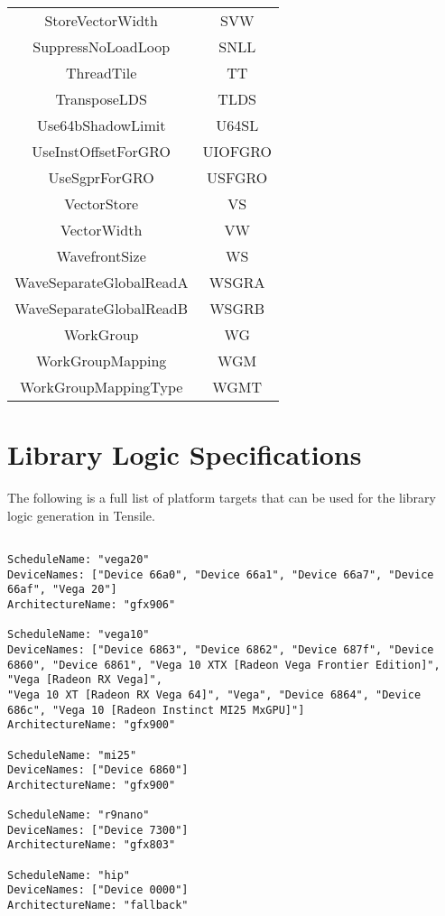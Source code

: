 \documentclass[]{article}
\begin{document}
\begin{center}
\begin{small}
\begin{longtable}{ |c|c| }
 StoreVectorWidth & SVW \\
 SuppressNoLoadLoop & SNLL \\
 ThreadTile & TT \\
 TransposeLDS & TLDS \\
 Use64bShadowLimit & U64SL \\
 UseInstOffsetForGRO & UIOFGRO \\
 UseSgprForGRO & USFGRO \\
 VectorStore & VS \\
 VectorWidth & VW \\
 WavefrontSize & WS \\
 WaveSeparateGlobalReadA & WSGRA \\
 WaveSeparateGlobalReadB & WSGRB \\
 WorkGroup & WG \\
 WorkGroupMapping & WGM \\
 WorkGroupMappingType & WGMT \\
 \hline
\end{longtable}
\end{small}
\end{center}

\section{Library Logic Specifications}
\label{sec:appendixD}

The following is a full list of platform targets that can be used for the library logic generation in Tensile.


\begin{verbatim}

ScheduleName: "vega20"
DeviceNames: ["Device 66a0", "Device 66a1", "Device 66a7", "Device 66af", "Vega 20"]
ArchitectureName: "gfx906"

ScheduleName: "vega10"
DeviceNames: ["Device 6863", "Device 6862", "Device 687f", "Device 6860", "Device 6861", "Vega 10 XTX [Radeon Vega Frontier Edition]", "Vega [Radeon RX Vega]",
"Vega 10 XT [Radeon RX Vega 64]", "Vega", "Device 6864", "Device 686c", "Vega 10 [Radeon Instinct MI25 MxGPU]"]
ArchitectureName: "gfx900"

ScheduleName: "mi25"
DeviceNames: ["Device 6860"]
ArchitectureName: "gfx900"

ScheduleName: "r9nano"
DeviceNames: ["Device 7300"]
ArchitectureName: "gfx803"

ScheduleName: "hip"
DeviceNames: ["Device 0000"]
ArchitectureName: "fallback"

\end{verbatim}
\end{document}
